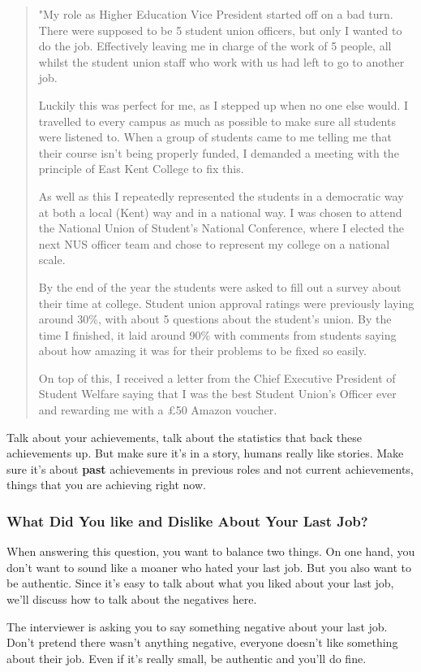 \documentclass{article}
\begin{document}
\begin{quote}
    "My role as Higher Education Vice President started off on a bad turn.
There were supposed to be 5 student union officers, but only I wanted to
do the job. Effectively leaving me in charge of the work of 5 people,
all whilst the student union staff who work with us had left to go to
another job.

Luckily this was perfect for me, as I stepped up when no one else would.
I travelled to every campus as much as possible to make sure all
students were listened to. When a group of students came to me telling
me that their course isn't being properly funded, I demanded a meeting
with the principle of East Kent College to fix this.

As well as this I repeatedly represented the students in a democratic
way at both a local (Kent) way and in a national way. I was chosen to
attend the National Union of Student's National Conference, where I
elected the next NUS officer team and chose to represent my college on a
national scale.

By the end of the year the students were asked to fill out a survey
about their time at college. Student union approval ratings were
previously laying around 30\%, with about 5 questions about the
student's union. By the time I finished, it laid around 90\% with
comments from students saying about how amazing it was for their
problems to be fixed so easily.

On top of this, I received a letter from the Chief Executive President
of Student Welfare saying that I was the best Student Union's Officer
ever and rewarding me with a £50 Amazon voucher.
\end{quote}
Talk about your achievements, talk about the statistics that back these
achievements up. But make sure it's in a story, humans really like
stories. Make sure it's about \textbf{past} achievements in previous
roles and not current achievements, things that you are achieving right
now.
\subsubsection{What Did You like and Dislike About Your Last Job?}
When answering this question, you want to balance two things. On one
hand, you don't want to sound like a moaner who hated your last job. But
you also want to be authentic. Since it's easy to talk about what you
liked about your last job, we'll discuss how to talk about the negatives
here.

The interviewer is asking you to say something negative about your last
job. Don't pretend there wasn't anything negative, everyone doesn't like
something about their job. Even if it's really small, be authentic and
you'll do fine.
\end{document}
